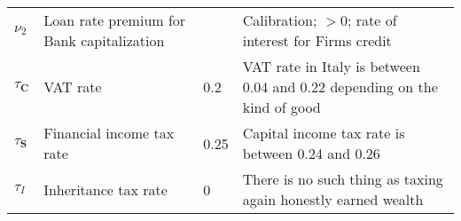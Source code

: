 \documentclass[a4paper, headings=standardclasses]{scrartcl}
\numberwithin{equation}{subsection}
\begin{document}
\begin{xltabular}{\linewidth}{lXlX}
    $\nu_2$                      & Loan rate premium for Bank capitalization                    &       & Calibration; $>0$; rate of interest for Firms credit                                                                                                                                                             \\
    $\tau_\mathbf{C}$            & VAT rate                                                     & 0.2   & VAT rate in Italy is between 0.04 and 0.22 depending on the kind of good                                                                                                                                                            \\
    $\tau_\mathbf{S}$            & Financial income tax rate                                    & 0.25  & Capital income tax rate is between 0.24 and 0.26                                                                                                                                                            \\
    $\tau_I$                     & Inheritance tax rate                                         & 0     & There is no such thing as taxing again honestly earned wealth                                                                                                                                                            \\

\end{xltabular}
\end{document}
